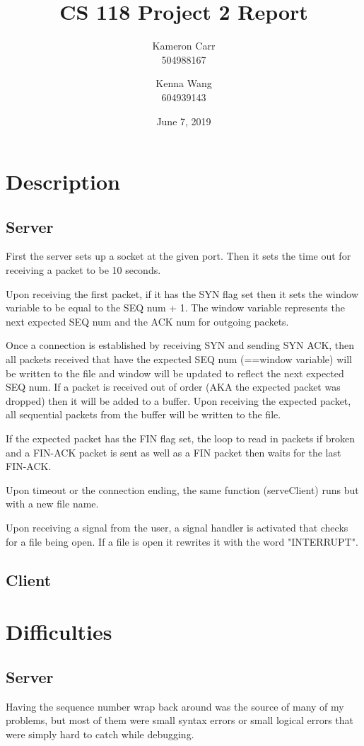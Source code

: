 \documentclass[12pt]{article}
\title{CS 118 Project 2 Report}
\author{Kameron Carr \\ 504988167 \and Kenna Wang \\ 604939143}
\date{June 7, 2019}
\begin{document}
\maketitle

\section{Description}
\subsection{Server}
First the server sets up a socket at the given port. Then it sets the time out for receiving a packet to be 10 seconds.

Upon receiving the first packet, if it has the SYN flag set then it sets the window variable to be equal to the SEQ num + 1. The window variable represents the next expected SEQ num and the ACK num for outgoing packets.

Once a connection is established by receiving SYN and sending SYN ACK, then all packets received that have the expected SEQ num (==window variable) will be written to the file and window will be updated to reflect the next expected SEQ num. If a packet is received out of order (AKA the expected packet was dropped) then it will be added to a buffer. Upon receiving the expected packet, all sequential packets from the buffer will be written to the file.

If the expected packet has the FIN flag set, the loop to read in packets if broken and a FIN-ACK packet is sent as well as a FIN packet then waits for the last FIN-ACK.

Upon timeout or the connection ending, the same function (serveClient) runs but with a new file name.

Upon receiving a signal from the user, a signal handler is activated that checks for a file being open. If a file is open it rewrites it with the word "INTERRUPT".

\subsection{Client}


\section{Difficulties}
\subsection{Server}
Having the sequence number wrap back around was the source of many of my problems, but most of them were small syntax errors or small logical errors that were simply hard to catch while debugging.
\end{document}

